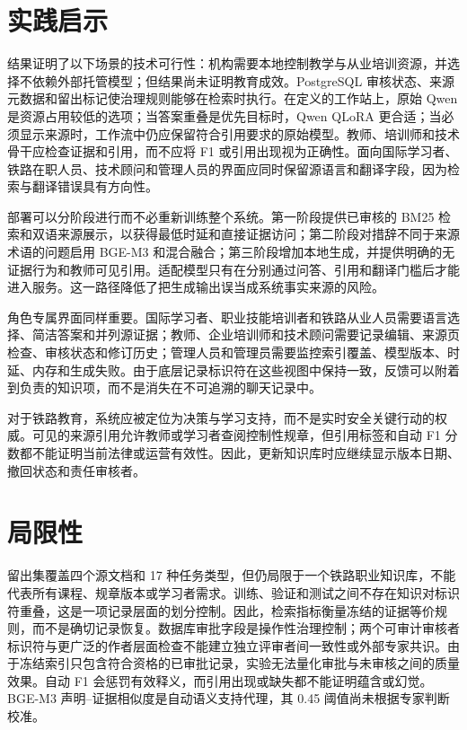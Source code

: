 \section{实践启示}

结果证明了以下场景的技术可行性：机构需要本地控制教学与从业培训资源，并选择不依赖外部托管模型；但结果尚未证明教育成效。PostgreSQL 审核状态、来源元数据和留出标记使治理规则能够在检索时执行。在定义的工作站上，原始 Qwen 是资源占用较低的选项；当答案重叠是优先目标时，Qwen QLoRA 更合适；当必须显示来源时，工作流中仍应保留符合引用要求的原始模型。教师、培训师和技术骨干应检查证据和引用，而不应将 F1 或引用出现视为正确性。面向国际学习者、铁路在职人员、技术顾问和管理人员的界面应同时保留源语言和翻译字段，因为检索与翻译错误具有方向性。

部署可以分阶段进行而不必重新训练整个系统。第一阶段提供已审核的 BM25 检索和双语来源展示，以获得最低时延和直接证据访问；第二阶段对措辞不同于来源术语的问题启用 BGE-M3 和混合融合；第三阶段增加本地生成，并提供明确的无证据行为和教师可见引用。适配模型只有在分别通过问答、引用和翻译门槛后才能进入服务。这一路径降低了把生成输出误当成系统事实来源的风险。

角色专属界面同样重要。国际学习者、职业技能培训者和铁路从业人员需要语言选择、简洁答案和并列源证据；教师、企业培训师和技术顾问需要记录编辑、来源页检查、审核状态和修订历史；管理人员和管理员需要监控索引覆盖、模型版本、时延、内存和生成失败。由于底层记录标识符在这些视图中保持一致，反馈可以附着到负责的知识项，而不是消失在不可追溯的聊天记录中。

对于铁路教育，系统应被定位为决策与学习支持，而不是实时安全关键行动的权威。可见的来源引用允许教师或学习者查阅控制性规章，但引用标签和自动 F1 分数都不能证明当前法律或运营有效性。因此，更新知识库时应继续显示版本日期、撤回状态和责任审核者。

\section{局限性}

留出集覆盖四个源文档和 17 种任务类型，但仍局限于一个铁路职业知识库，不能代表所有课程、规章版本或学习者需求。训练、验证和测试之间不存在知识对标识符重叠，这是一项记录层面的划分控制。因此，检索指标衡量冻结的证据等价规则，而不是确切记录恢复。数据库审批字段是操作性治理控制；两个可审计审核者标识符与更广泛的作者层面检查不能建立独立评审者间一致性或外部专家共识。由于冻结索引只包含符合资格的已审批记录，实验无法量化审批与未审核之间的质量效果。自动 F1 会惩罚有效释义，而引用出现或缺失都不能证明蕴含或幻觉。BGE-M3 声明--证据相似度是自动语义支持代理，其 0.45 阈值尚未根据专家判断校准。

